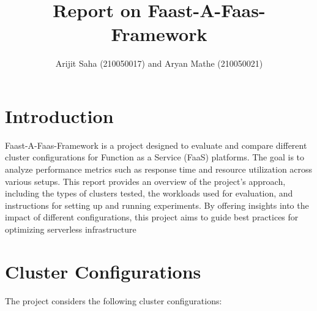 \documentclass{article}
\title{Report on Faast-A-Faas-Framework}
\author{Arijit Saha (210050017) and Aryan Mathe (210050021)}
\date{}
\begin{document}
\maketitle

\section{Introduction}
Faast-A-Faas-Framework is a project designed to evaluate and compare different
cluster configurations for Function as a Service (FaaS) platforms. The goal is
to analyze performance metrics such as response time and resource
utilization across various setups. This report provides an overview of the
project's approach, including the types of clusters tested, the workloads used
for evaluation, and instructions for setting up and running experiments. By
offering insights into the impact of different configurations, this project
aims to guide best practices for optimizing serverless infrastructure

\section{Cluster Configurations}
The project considers the following cluster configurations:
\end{document}
